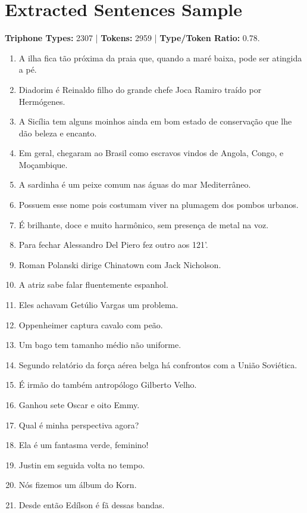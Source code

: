 \section{Extracted Sentences Sample}

\textbf{Triphone Types:} 2307 | \textbf{Tokens:} 2959 | \textbf{Type/Token Ratio:} 0.78.

\begin{enumerate}
\item A ilha fica t\~ao pr\'oxima da praia que, quando a mar\'e baixa, pode ser atingida a p\'e.
\item Diadorim \'e Reinaldo filho do grande chefe Joca Ramiro tra\'ido por Herm\'ogenes.
\item A Sic\'ilia tem alguns moinhos ainda em bom estado de conserva\c{c}\~ao que lhe d\~ao beleza e encanto.
\item Em geral, chegaram ao Brasil como escravos vindos de Angola, Congo, e Mo\c{c}ambique.
\item A sardinha \'e um peixe comum nas \'aguas do mar Mediterr\^aneo.
\item Possuem esse nome pois costumam viver na plumagem dos pombos urbanos.
\item \'E brilhante, doce e muito harm\^onico, sem presen\c{c}a de metal na voz.
\item Para fechar Alessandro Del Piero fez outro aos 121'.
\item Roman Polanski dirige Chinatown com Jack Nicholson.
\item A atriz sabe falar fluentemente espanhol.
\item Eles achavam Get\'ulio Vargas um problema.
\item Oppenheimer captura cavalo com pe\~ao.
\item Um bago tem tamanho m\'edio n\~ao uniforme.
\item Segundo relat\'orio da for\c{c}a a\'erea belga h\'a confrontos com a Uni\~ao Sovi\'etica.
\item \'E irm\~ao do tamb\'em antrop\'ologo Gilberto Velho.
\item Ganhou sete Oscar e oito Emmy.
\item Qual \'e minha perspectiva agora?
\item Ela \'e um fantasma verde, feminino!
\item Justin em seguida volta no tempo.
\item N\'os fizemos um \'album do Korn.
\item Desde ent\~ao Ed\'ilson \'e f\~a dessas bandas.

\end{enumerate}
